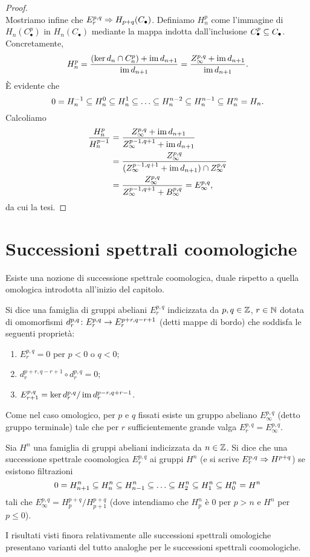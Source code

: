\begin{proof}
\[\]
Mostriamo infine che \(E^{p,q}_r\Rightarrow H_{p+q}(C_\bullet)\). Definiamo \(H^p_n\) come l'immagine di \(H_n(C^p_\bullet)\) in \(H_n(C_\bullet)\) mediante la mappa indotta dall'inclusione \(C^p_\bullet\subseteq C_\bullet\). Concretamente,
\[
H^p_n=\frac{(\ker d_n\cap C^p_n)+\operatorname{im} d_{n+1}}{\operatorname{im} d_{n+1}}=\frac{Z^{p,q}_\infty+\operatorname{im} d_{n+1}}{\operatorname{im} d_{n+1}}.
\]
È evidente che
\[
0=H^{-1}_n\subseteq H^0_n\subseteq H^1_n\subseteq\ldots\subseteq H^{n-2}_n\subseteq H^{n-1}_n\subseteq H^n_n=H_n.
\]
Calcoliamo
\begin{align*}
\frac{H^p_n}{H^{p-1}_n}&=\frac{Z^{p,q}_\infty+\operatorname{im} d_{n+1}}{Z^{p-1,q+1}_\infty+\operatorname{im} d_{n+1}}\\
&=\frac{Z^{p,q}_\infty}{(Z^{p-1,q+1}_\infty+\operatorname{im} d_{n+1})\cap Z^{p,q}_\infty}\\
&=\frac{Z^{p,q}_\infty}{Z^{p-1,q+1}_\infty+B^{p,q}_\infty}=E^{p,q}_\infty,
\end{align*}
da cui la tesi.
\end{proof}

\section{Successioni spettrali coomologiche}

Esiste una nozione di successione spettrale coomologica, duale rispetto a quella omologica introdotta all'inizio del capitolo.

\begin{definition}
Si dice  una famiglia di gruppi abeliani \(E^{p,q}_r\) indicizzata da \(p,q\in\mathbb{Z}\), \(r\in\mathbb{N}\) dotata di omomorfismi \(\map{d^{p,q}_r}{E^{p,q}_r}{E^{p+r,q-r+1}_r}\) (detti mappe di bordo) che soddisfa le seguenti proprietà:
\begin{enumerate}
\item \(E^{p,q}_r=0\) per \(p<0\) o \(q<0\);
\item \(d^{p+r,q-r+1}_r\circ d^{p,q}_r=0\);
\item \(E^{p,q}_{r+1}=\ker d^{p,q}_r/\operatorname{im} d^{p-r,q+r-1}_r\).
\end{enumerate}
\end{definition}
Come nel caso omologico, per \(p\) e \(q\) fissati esiste un gruppo abeliano \(E^{p,q}_\infty\) (detto gruppo terminale) tale che per \(r\) sufficientemente grande valga \(E^{p,q}_r=E^{p,q}_\infty\).
\begin{definition}
Sia \(H^n\) una famiglia di gruppi abeliani indicizzata da \(n\in\mathbb{Z}\).
Si dice che una successione spettrale coomologica \(E^{p,q}_r\)  ai gruppi \(H^n\) (e si scrive \(E^{p,q}_r\Rightarrow H^{p+q}\)) se esistono filtrazioni
\[
0=H^n_{n+1}\subseteq H^n_n\subseteq H^n_{n-1}\subseteq\ldots\subseteq H^n_2\subseteq H^n_1\subseteq H^n_0=H^n
\]
tali che \(E^{p,q}_\infty=H^{p+q}_p/H^{p+q}_{p+1}\) (dove intendiamo che \(H_p^n\) è \(0\) per \(p>n\) e \(H^n\) per \(p\le 0\)).
\end{definition}
I risultati visti finora relativamente alle successioni spettrali omologiche presentano varianti del tutto analoghe per le successioni spettrali coomologiche.
